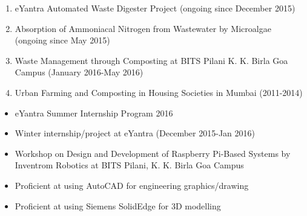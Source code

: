 \documentclass{article}
\begin{document}
	\begin{flushleft}
		\vspace{0.30in}
		
		\vspace{0.10in}
		\begin{enumerate}
			\item eYantra Automated Waste Digester Project (ongoing since December 2015)
			\item Absorption of Ammoniacal Nitrogen from Wastewater by Microalgae (ongoing since May 2015)
			\item Waste Management through Composting at BITS Pilani K. K. Birla Goa Campus (January 2016-May 2016)
			\item Urban Farming and Composting in Housing Societies in Mumbai (2011-2014)
		\end{enumerate}
		
	\end{flushleft}
	
	\begin{flushleft}
		\vspace{0.30in}
		
		\vspace{0.10in}
		\begin{itemize}
			
			\item eYantra Summer Internship Program 2016
			\item Winter internship/project at eYantra (December 2015-Jan 2016)
			\item Workshop on Design and Development of Raspberry Pi-Based Systems by Inventrom Robotics at BITS Pilani, K. K. Birla Goa Campus
		\end{itemize}
		
	\end{flushleft}
	
\begin{flushleft}
	\vspace{0.30in}
	
	\vspace{0.10in}
	\begin{itemize}
		
		\item Proficient at using AutoCAD for engineering graphics/drawing
		\item Proficient at using Siemens SolidEdge for 3D modelling
		
	\end{itemize}
	
\end{flushleft}	
\end{document}
